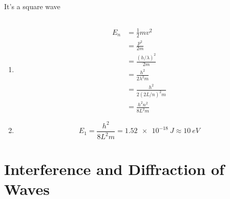 \documentclass{article}
\begin{document}
\subsection{}

It's a square wave

\subsection{}

\begin{enumerate}
  \item

        \begin{align*}
          E_n & = \frac{1}{2} m v^2           \\
              & = \frac{p^2}{2 m}             \\
              & = \frac{(h / \lambda)^2}{2 m} \\
              & = \frac{h^2}{2 \lambda^2 m}   \\
              & = \frac{h^2}{2 (2 L / n)^2 m} \\
              & = \frac{h^2 n^2}{8 L^2 m}
        \end{align*}

  \item \[E_1 = \frac{h^2}{8 L^2 m} = \qty{1.52e-18}{J} \approx \qty{10}{eV}\]
\end{enumerate}

\section{Interference and Diffraction of Waves}

\subsection{}
\end{document}
